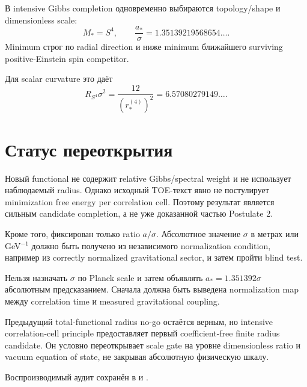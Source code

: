 \begin{theorem}
В intensive Gibbs completion одновременно выбираются topology/shape и
dimensionless scale:
\begin{equation}
 M_*=S^4,
 \qquad
 \frac{a_*}{\sigma}=1.35139219568654\ldots.
\end{equation}
Minimum строг по radial direction и ниже minimum ближайшего surviving
positive-Einstein spin competitor.
\end{theorem}

Для scalar curvature это даёт
\begin{equation}
 R_{S^4}\sigma^2
 =\frac{12}{(r_*^{(4)})^2}
 =6.57080279149\ldots.
\end{equation}

\section{Статус переоткрытия}

Новый functional не содержит relative Gibbs/spectral weight и не использует
наблюдаемый radius. Однако исходный TOE-текст явно не постулирует
minimization free energy per correlation cell. Поэтому результат является
сильным candidate completion, а не уже доказанной частью Postulate 2.

Кроме того, фиксирован только ratio \(a/\sigma\). Абсолютное значение
\(\sigma\) в метрах или GeV\(^{-1}\) должно быть получено из независимого
normalization condition, например из correctly normalized gravitational
sector, и затем пройти blind test.

\begin{nogocriterion}
Нельзя назначать \(\sigma\) по Planck scale и затем объявлять
\(a_*=1.351392\sigma\) абсолютным предсказанием. Сначала должна быть выведена
normalization map между correlation time и measured gravitational coupling.
\end{nogocriterion}

\begin{theorem}
Предыдущий total-functional radius no-go остаётся верным, но intensive
correlation-cell principle предоставляет первый coefficient-free finite
radius candidate. Он условно переоткрывает scale gate на уровне
dimensionless ratio и vacuum equation of state, не закрывая абсолютную
физическую шкалу.
\end{theorem}

Воспроизводимый аудит сохранён в
 и
.